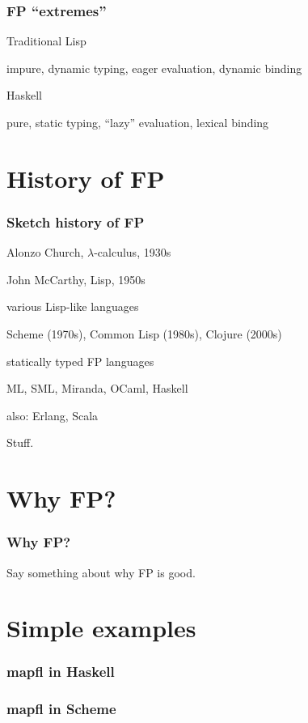 \begin{frame}
\frametitle{FP ``extremes''}
\bi
\item Traditional Lisp
\bi
\item impure, dynamic typing, eager evaluation, dynamic binding
\ei
\item Haskell
\bi
\item pure, static typing, ``lazy'' evaluation, lexical binding
\ei
\ei
\end{frame}

\section{History of FP}

\begin{frame}
\frametitle{Sketch history of FP}
\bi
\item Alonzo Church, $\lambda$-calculus, 1930s
\item John McCarthy, Lisp, 1950s
\item various Lisp-like languages
\bi
\item Scheme (1970s), Common Lisp (1980s), Clojure (2000s)
\ei
\item statically typed FP languages
\bi
\item ML, SML, Miranda, OCaml, Haskell
\ei
\item also: Erlang, Scala
\ei
\begin{annotation}
Stuff.
\end{annotation}
\end{frame}

\section{Why FP?}

\begin{frame}
\frametitle{Why FP?}
Say something about why FP is good.
\end{frame}

\section{Simple examples}

\begin{frame}
\frametitle{mapfl in Haskell}

\end{frame}

\begin{frame}
\frametitle{mapfl in Scheme}

\end{frame}

